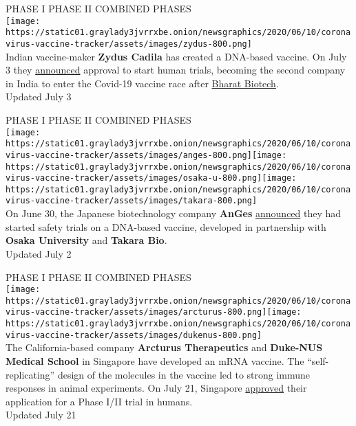 PHASE I PHASE II COMBINED PHASES\\
\texttt{[image: https://static01.graylady3jvrrxbe.onion/newsgraphics/2020/06/10/coronavirus-vaccine-tracker/assets/images/zydus-800.png]}\\
Indian vaccine-maker \textbf{Zydus Cadila} has created a DNA-based
vaccine. On July 3 they
\href{https://twitter.com/ZydusUniverse/status/1278997989382483968}{announced}
approval to start human trials, becoming the second company in India to
enter the Covid-19 vaccine race after \protect\hyperlink{bharat}{Bharat
Biotech}.\\
Updated July 3

PHASE I PHASE II COMBINED PHASES\\
\texttt{[image: https://static01.graylady3jvrrxbe.onion/newsgraphics/2020/06/10/coronavirus-vaccine-tracker/assets/images/anges-800.png]}\texttt{[image: https://static01.graylady3jvrrxbe.onion/newsgraphics/2020/06/10/coronavirus-vaccine-tracker/assets/images/osaka-u-800.png]}\texttt{[image: https://static01.graylady3jvrrxbe.onion/newsgraphics/2020/06/10/coronavirus-vaccine-tracker/assets/images/takara-800.png]}\\
On June 30, the Japanese biotechnology company \textbf{AnGes}
\href{https://www.japantimes.co.jp/news/2020/06/30/national/science-health/japan-first-coronavirus-vaccine-clinical-test-starts/}{announced}
they had started safety trials on a DNA-based vaccine, developed in
partnership with \textbf{Osaka University} and \textbf{Takara Bio}.\\
Updated July 2

PHASE I PHASE II COMBINED PHASES\\
\texttt{[image: https://static01.graylady3jvrrxbe.onion/newsgraphics/2020/06/10/coronavirus-vaccine-tracker/assets/images/arcturus-800.png]}\texttt{[image: https://static01.graylady3jvrrxbe.onion/newsgraphics/2020/06/10/coronavirus-vaccine-tracker/assets/images/dukenus-800.png]}\\
The California-based company \textbf{Arcturus Therapeutics} and
\textbf{Duke-NUS Medical School} in Singapore have developed an mRNA
vaccine. The ``self-replicating'' design of the molecules in the vaccine
led to strong immune responses in animal experiments. On July 21,
Singapore
\href{https://ir.arcturusrx.com/news-releases/news-release-details/arcturus-therapeutics-duke-nus-received-approval-proceed-phase}{approved}
their application for a Phase I/II trial in humans.\\
Updated July 21

